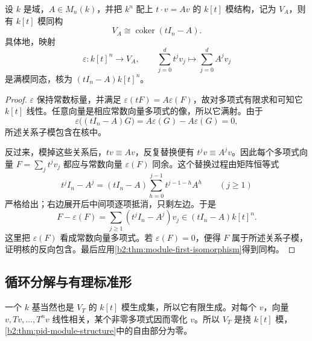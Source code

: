\begin{proposition}\label{b2:prop:operator-polynomial-matrix}
	设 \(k\) 是域，\(A\in M_n(k)\)，并把 \(k^n\) 配上 \(t\cdot v=Av\) 的 \(k[t]\) 模结构，记为 \(V_A\)，则有 \(k[t]\) 模同构
	\[
		V_A\cong\operatorname{coker}(tI_n-A).
	\]
	具体地，映射
	\[
		\varepsilon:k[t]^n\longrightarrow V_A,\qquad \sum_{j=0}^d t^jv_j\longmapsto\sum_{j=0}^d A^jv_j
	\]
	是满模同态，核为 \((tI_n-A)k[t]^n\)。
\end{proposition}
\begin{proof}
	\(\varepsilon\) 保持常数标量，并满足 \(\varepsilon(tF)=A\varepsilon(F)\)，故对多项式有限求和可知它 \(k[t]\) 线性。任意向量是相应常数向量多项式的像，所以它满射。由于
	\[
		\varepsilon\bigl((tI_n-A)G\bigr) =A\varepsilon(G)-A\varepsilon(G)=0,
	\]
	所述关系子模包含在核中。

	反过来，模掉这些关系后，\(tv\equiv Av\)，反复替换便有 \(t^jv\equiv A^jv\)。因此每个多项式向量 \(F=\sum_jt^jv_j\) 都应与常数向量 \(\varepsilon(F)\) 同余。这个替换过程由矩阵恒等式
	\[
		t^jI_n-A^j=(tI_n-A)\sum_{h=0}^{j-1}t^{j-1-h}A^h \qquad(j\ge1)
	\]
	严格给出；右边展开后中间项逐项抵消，只剩左边。于是
	\[
		F-\varepsilon(F) =\sum_{j\ge1}(t^jI_n-A^j)v_j \in(tI_n-A)k[t]^n.
	\]
	这里把 \(\varepsilon(F)\) 看成常数向量多项式。若 \(\varepsilon(F)=0\)，便得 \(F\) 属于所述关系子模，证明核的反向包含。最后应用\cref{b2:thm:module-first-isomorphism}得到同构。
\end{proof}

\subsection{循环分解与有理标准形}
\label{b2:subsec:0404:02}

一个 \(k\) 基当然也是 \(V_T\) 的 \(k[t]\) 模生成集，所以它有限生成。对每个 \(v\)，向量 \(v,Tv,\ldots,T^nv\) 线性相关，某个非零多项式因而零化 \(v\)。所以 \(V_T\) 是挠 \(k[t]\) 模，\cref{b2:thm:pid-module-structure}中的自由部分为零。

